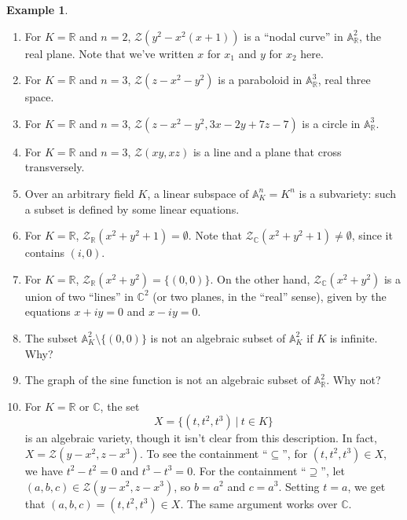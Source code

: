 \documentclass{amsart}[12pt]
\newcommand{\A}{\mathbb{A}}
\newcommand{\C}{\mathbb{C}}
\newcommand{\cZ}{\mathcal{Z}}
\numberwithin{equation}{section}
\theoremstyle{plain} %
\theoremstyle{definition}
\newtheorem{ex}[equation]{Example}
\theoremstyle{remark}
\begin{document}
\begin{ex}
\begin{enumerate}

\item For $K = \mathbb{R}$ and $n = 2$, $\mathcal{Z}(y^2 - x^2(x+1))$ is a ``nodal curve'' in $\A^2_\mathbb{R}$, the real plane. Note that we've written $x$ for $x_1$ and $y$ for $x_2$ here.
\item
For $K = \mathbb{R}$ and $n = 3$, $\mathcal{Z}(z - x^2 - y^2)$ is a paraboloid in $\A^3_\mathbb{R}$, real three space. 
\item For $K = \mathbb{R}$ and $n = 3$, $\mathcal{Z}(z - x^2 - y^2, 3x - 2y + 7z - 7)$ is a circle in $\A^3_\mathbb{R}$.
\item For $K = \mathbb{R}$ and $n=3$, $\cZ(xy,xz)$ is a line and a plane that cross transversely.
 
 \item Over an arbitrary field $K$, a linear subspace of $\A^n_K = K^n$ is a subvariety: such a subset is defined by some linear equations.
 

 
 \item For $K = \mathbb{R}$, $\mathcal{Z}_\mathbb{R}(x^2 + y^2 + 1) = \emptyset$. Note that $\mathcal{Z}_\mathbb{C}(x^2 + y^2 +1 ) \neq \emptyset$, since it contains $(i,0)$.
 
   \item For $K = \mathbb{R}$, $\mathcal{Z}_\mathbb{R}(x^2 + y^2) = \{(0,0)\}$. On the other hand, $\mathcal{Z}_\mathbb{C}(x^2 + y^2)$ is a union of two ``lines'' in $\C^2$ (or two planes, in the ``real'' sense), given by the equations $x+iy=0$ and $x-iy=0$.



\item The subset $\A^2_K \setminus \{(0,0)\}$ is not an algebraic subset of $\A^2_K$ if $K$ is infinite. Why?


\item The graph of the sine function is not an algebraic subset of $\A^2_\mathbb{R}$. Why not?

\item For $K = \mathbb{R}$ or $\C$, the set
\[ X= \{ (t,t^2,t^3) \ | \ t\in K\} \] is an algebraic variety, though it isn't clear from this description. In fact, $X=\mathcal{Z}(y-x^2, z-x^3)$. To see the containment ``$\subseteq$'', for $(t,t^2,t^3)\in X$, we have $t^2- t^2=0$ and $t^3 - t ^3=0$. For the containment ``$\supseteq$'', let $(a,b,c)\in  \mathcal{Z}(y-x^2,  z-x^3)$, so $b=a^2$ and $c=a^3$. Setting $t=a$, we get that $(a,b,c)=(t,t^2,t^3)\in X$. The same argument works over $\C$. 


\end{enumerate}
\end{ex}
\end{document}
